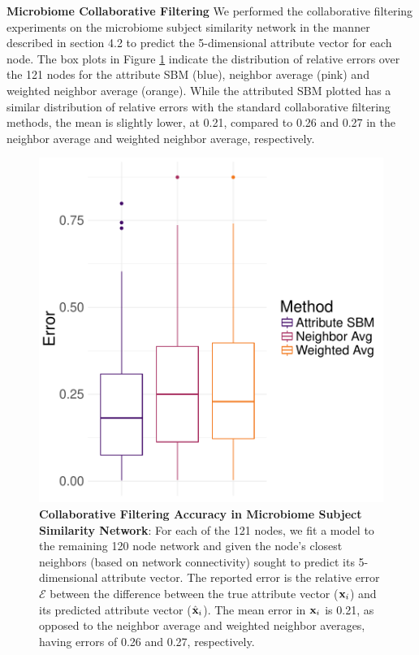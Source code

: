 {\bf Microbiome Collaborative Filtering}
We performed the collaborative filtering experiments on the microbiome subject similarity network in the manner described in section 4.2 to predict the 5-dimensional attribute vector for each node. The box plots in Figure \ref{Fig6} indicate the distribution of relative errors over the 121 nodes for the attribute SBM (blue), neighbor average (pink) and weighted neighbor average (orange). While the attributed SBM plotted has a similar distribution of relative errors with the standard collaborative filtering methods, the mean is slightly lower, at 0.21, compared to 0.26 and 0.27 in the neighbor average and weighted neighbor average, respectively.
\begin{figure}[h!]
\begin{center}
\includegraphics[width=1\textwidth]{CollabFilterMicro.pdf}
\caption{{\bf Collaborative Filtering Accuracy in Microbiome Subject Similarity Network}: For each of the 121 nodes, we fit a model to the remaining 120 node network and given the node's closest  neighbors (based on network connectivity) sought to predict its 5-dimensional attribute vector. The reported error is the relative error $\mathcal{E}$ between the difference between the true attribute vector (${\bf x}_{i}$) and its predicted attribute vector (${\hat{\bf x}}_{i}$). The mean error in ${\bf x}_{i}$ is 0.21, as opposed to the neighbor average and weighted neighbor averages, having errors of 0.26 and 0.27, respectively. }
\label{Fig6}
\end{center}
\end{figure}

